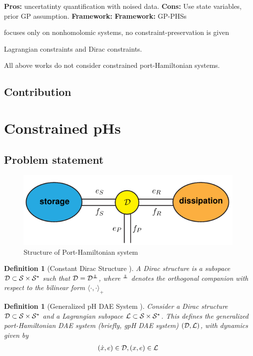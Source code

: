 \documentclass[letterpaper, 10 pt, conference]{ieeeconf}
\newcommand\independent{\protect\mathpalette{\protect\independenT}{\perp}}
\def\independenT#1#2{\mathrel{\rlap{$#1#2$}\mkern2mu{#1#2}}}
\newtheorem{definition}[theorem]{Definition}
\begin{document}
\noindent\cite{beckersGaussianProcessPortHamiltonian2022} {\bf Pros:} uncertatinty quantification with noised data. {\bf Cons:} Use state variables, prior GP assumption. {\bf Framework:} {\bf Framework:} GP-PHSs

\noindent\cite{altawaitanHamiltonianDynamicsLearning2024} focuses only on nonhomolomic systems, no constraint-preservation is given

\noindent\cite{vanderschaftGeneralizedPortHamiltonianDAE2018,
vanderschaftDiracLagrangeAlgebraic2020} Lagrangian constraints and Dirac constraints.

All above works do not consider constrained port-Hamiltonian systems.

\subsection{Contribution}

\section{Constrained pHs}
\subsection{Problem statement}
\begin{figure}
    \includegraphics[width = \linewidth]{pH.PNG}
    \caption{Structure of Port-Hamiltonian system}
\end{figure}


\begin{definition}[Constant Dirac Structure \cite{schaftPortHamiltonianSystemsTheory2014}] 
    A Dirac structure is
    a subspace ${\mathcal D} \subset {\mathcal S} \times {\mathcal S}^\star$ such that $\Dc = \Dc^{\independent}$, where $^{\independent}$ denotes
    the orthogonal companion with respect to the bilinear form $\langle\cdot,\cdot\rangle_+$
\end{definition}

\begin{definition}[Generalized pH DAE System \cite{vanderschaftGeneralizedPortHamiltonianDAE2018}] Consider a Dirac
    structure ${\mathcal D} \subset {\mathcal S} \times {\mathcal S}^\star$ and a Lagrangian subspace ${\mathcal L} \subset {\mathcal S} \times {\mathcal S}^\star$.
    This defines the generalized port-Hamiltonian DAE system (briefly,
    gpH DAE system) $({\mathcal D}, {\mathcal L})$, with dynamics given by    
    \begin{align}
        (\dot x, e) \in {\mathcal D}, (x,e) \in {\mathcal L}
    \end{align}
\end{definition}
\end{document}
